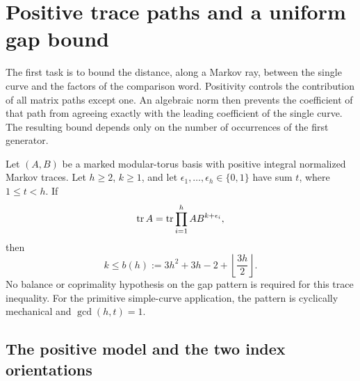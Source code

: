 \section{Positive trace paths and a uniform gap bound}
\label{sec:gap}

The first task is to bound the distance, along a Markov ray, between
the single curve and the factors of the comparison word. Positivity
controls the contribution of all matrix paths except one. An algebraic
norm then prevents the coefficient of that path from agreeing exactly
with the leading coefficient of the single curve. The resulting bound
depends only on the number of occurrences of the first generator.

\begin{theorem}\label{thm:gap-bound}
Let $(A,B)$ be a marked modular-torus basis with positive integral
normalized Markov traces. Let $h\geqslant2$, $k\geqslant1$, and let
$\epsilon_1,\ldots,\epsilon_h\in\{0,1\}$ have sum $t$, where
$1\leqslant t<h$. If
\begin{equation}\label{eq:gap-original-equality}
 \operatorname{tr} A=\operatorname{tr}\prod_{i=1}^h AB^{k+\epsilon_i},
\end{equation}
then
\begin{equation}\label{eq:gap-final-bound}
 k\leqslant b(h):=3h^2+3h-2+\left\lfloor\frac{3h}{2}\right\rfloor.
\end{equation}
No balance or coprimality hypothesis on the gap pattern is required
for this trace inequality. For the primitive simple-curve application,
the pattern is cyclically mechanical and $\gcd(h,t)=1$.
\end{theorem}

\subsection{The positive model and the two index orientations}

